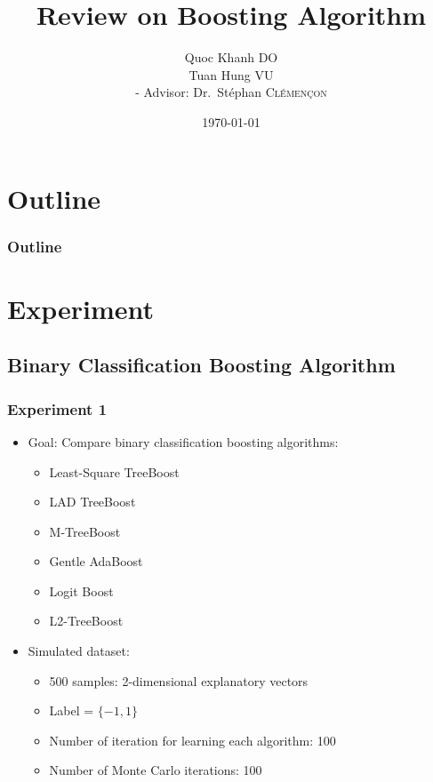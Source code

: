 \documentclass[]{beamer}
\title{Review on Boosting Algorithm}
\author{Quoc Khanh \textsc{DO}\\Tuan Hung \textsc{VU}\\ - Advisor: Dr.~Stéphan \textsc{Clémençon}}
\date{\today}
\begin{document}
\frame{\titlepage}
\section*{Outline}
\begin{frame}
	\frametitle{Outline}
	\tableofcontents[currentsections]
\end{frame}


\section{Experiment}
\subsection{Binary Classification Boosting Algorithm}
\begin{frame}
	\frametitle{Experiment 1}
	\begin{itemize}
		\item Goal: Compare binary classification boosting algorithms:
			\begin{itemize}
				\item Least-Square TreeBoost
				\item LAD TreeBoost
				\item M-TreeBoost
				\item Gentle AdaBoost
				\item Logit Boost
				\item L2-TreeBoost
			\end{itemize}

		\item Simulated dataset:
			\begin{itemize}
				\item 500 samples: 2-dimensional explanatory vectors
				\item Label = $\{-1, 1\}$
				\item Number of iteration for learning each algorithm: 100
				\item Number of Monte Carlo iterations: 100
			\end{itemize}
	\end{itemize}
\end{frame}
\end{document}
